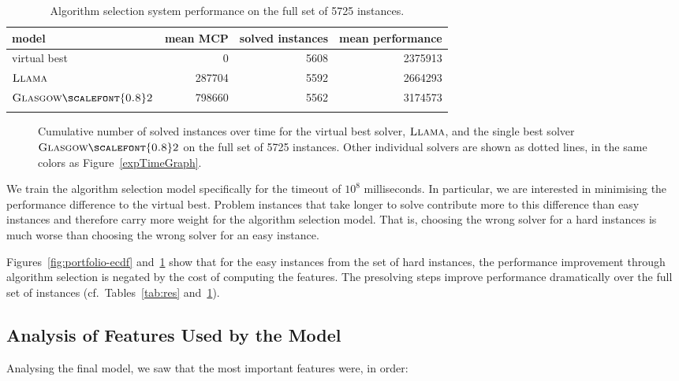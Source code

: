 \documentclass{llncs}
\newcommand{\GlasgowTwo}{$\textsc{Glasgow{\scalefont{0.8}2}}$\xspace}
\newcommand{\LLAMA}{$\textsc{Llama}$\xspace}
\begin{document}
\begin{table}[p]
    \centering\setlength{\tabcolsep}{1em}
\begin{tabular}{lrrr}
  \toprule
model & mean MCP & solved instances & mean performance\\
  \midrule
virtual best & 0 & 5608 & 2375913\\
\LLAMA & 287704 & 5592 & 2664293\\
\GlasgowTwo & 798660 & 5562 & 3174573\\
   \bottomrule \\
\end{tabular}
\caption{Algorithm selection system performance on the full set of 5725
instances.}\label{tab:resfull}
\end{table}

\begin{figure}[p]
    
\caption{Cumulative number of solved instances over time for the virtual best solver,
\LLAMA, and the single best solver \GlasgowTwo on the full set of 5725
instances. Other individual solvers are shown as dotted lines, in the same
colors as Figure~\ref{expTimeGraph}. }
\label{fig:portfolio-ecdf-full}

\end{figure}

We train the algorithm selection model specifically for the timeout of $10^8$
milliseconds. In particular, we are interested in minimising the performance
difference to the virtual best. Problem instances that take longer to solve
contribute more to this difference than easy instances and therefore carry more
weight for the algorithm selection model. That is, choosing the wrong solver for
a hard instances is much worse than choosing the wrong solver for an easy
instance.

Figures~\ref{fig:portfolio-ecdf} and~\ref{fig:portfolio-ecdf-full}
show that for the easy instances from the set of hard instances, the performance
improvement through algorithm selection is negated by the cost of computing the
features. The presolving steps improve performance dramatically over the full
set of instances (cf.\ Tables~\ref{tab:res} and~\ref{tab:resfull}).

\subsection{Analysis of Features Used by the Model}

Analysing the final model, we saw that the most important features were, in order:
\end{document}
